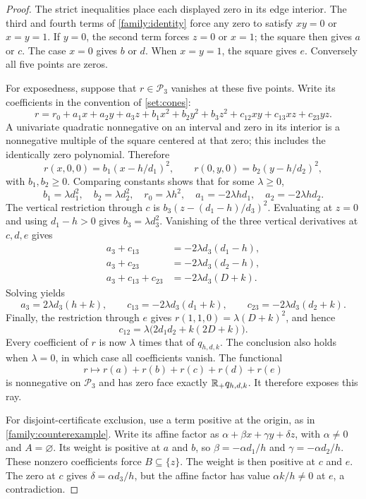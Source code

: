 \begin{proof}
The strict inequalities place each displayed zero in its edge interior.
The third and fourth terms of \eqref{family:identity} force any zero to
satisfy $xy=0$ or $x=y=1$. If $y=0$, the second term forces $z=0$ or
$x=1$; the square then gives $a$ or $c$. The case $x=0$ gives $b$ or $d$.
When $x=y=1$, the square gives $e$. Conversely all five points are zeros.

For exposedness, suppose that $r\in\mathcal P_3$ vanishes at these five
points. Write its coefficients in the convention of \cref{set:cones}:
\[
r=r_0+a_1x+a_2y+a_3z+b_1x^2+b_2y^2+b_3z^2
  +c_{12}xy+c_{13}xz+c_{23}yz.
\]
A univariate quadratic nonnegative on an interval and zero in its
interior is a nonnegative multiple of the square centered at that zero;
this includes the identically zero polynomial. Therefore
\[
r(x,0,0)=b_1(x-h/d_1)^2,\qquad
r(0,y,0)=b_2(y-h/d_2)^2,
\]
with $b_1,b_2\ge0$. Comparing constants shows that for some $\lambda\ge0$,
\begin{equation}
\label{family:contact-bottom}
b_1=\lambda d_1^2,\quad b_2=\lambda d_2^2,\quad
r_0=\lambda h^2,\quad
a_1=-2\lambda hd_1,\quad a_2=-2\lambda hd_2.
\end{equation}
The vertical restriction through $c$ is
$b_3(z-(d_1-h)/d_3)^2$. Evaluating at $z=0$ and using
$d_1-h>0$ gives $b_3=\lambda d_3^2$.
Vanishing of the three vertical derivatives at $c,d,e$ gives
\begin{align*}
a_3+c_{13}&=-2\lambda d_3(d_1-h),\\
a_3+c_{23}&=-2\lambda d_3(d_2-h),\\
a_3+c_{13}+c_{23}&=-2\lambda d_3(D+k).
\end{align*}
Solving yields
\begin{equation}
\label{family:contact-mixed}
a_3=2\lambda d_3(h+k),\qquad
c_{13}=-2\lambda d_3(d_1+k),\qquad
c_{23}=-2\lambda d_3(d_2+k).
\end{equation}
Finally, the restriction through $e$ gives
$r(1,1,0)=\lambda(D+k)^2$, and hence
\[
c_{12}=\lambda\bigl(2d_1d_2+k(2D+k)\bigr).
\]
Every coefficient of $r$ is now $\lambda$ times that of $q_{h,d,k}$.
The conclusion also holds when $\lambda=0$, in which case all coefficients
vanish. The functional
\[
r\longmapsto r(a)+r(b)+r(c)+r(d)+r(e)
\]
is nonnegative on $\mathcal P_3$ and has zero face exactly
$\mathbb R_+q_{h,d,k}$. It therefore exposes this ray.

For disjoint-certificate exclusion, use a term positive at the origin,
as in \cref{family:counterexample}. Write its affine factor as
$\alpha+\beta x+\gamma y+\delta z$, with $\alpha\ne0$ and
$A=\varnothing$. Its weight is positive at $a$ and $b$, so
$\beta=-\alpha d_1/h$ and $\gamma=-\alpha d_2/h$.
These nonzero coefficients force $B\subseteq\{z\}$. The weight is then
positive at $c$ and $e$. The zero at $c$ gives
$\delta=\alpha d_3/h$, but the affine factor has value $\alpha k/h\ne0$
at $e$, a contradiction.
\end{proof}

